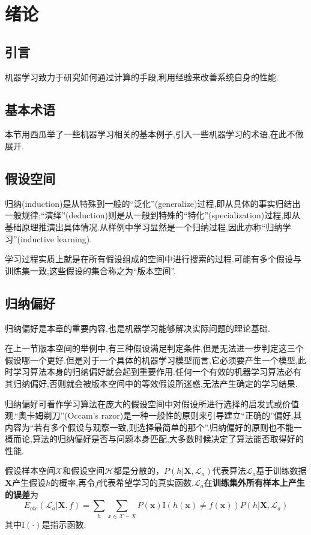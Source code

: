\chapter{绪论}

\section{引言}

机器学习致力于研究如何通过计算的手段,利用经验来改善系统自身的性能.

\section{基本术语}

本节用西瓜举了一些机器学习相关的基本例子,引入一些机器学习的术语,在此不做展开.

\section{假设空间}

归纳(induction)是从特殊到一般的``泛化''(generalize)过程,即从具体的事实归结出一般规律;``演绎''(deduction)则是从一般到特殊的``特化''(specialization)过程,即从基础原理推演出具体情况.从样例中学习显然是一个归纳过程,因此亦称``归纳学习''(inductive learning).

学习过程实质上就是在所有假设组成的空间中进行搜索的过程.可能有多个假设与训练集一致,这些假设的集合称之为``版本空间''.

\section{归纳偏好}

归纳偏好是本章的重要内容,也是机器学习能够解决实际问题的理论基础.

在上一节版本空间的举例中,有三种假设满足判定条件,但是无法进一步判定这三个假设哪一个更好.但是对于一个具体的机器学习模型而言,它必须要产生一个模型,此时学习算法本身的归纳偏好就会起到重要作用.任何一个有效的机器学习算法必有其归纳偏好,否则就会被版本空间中的等效假设所迷惑,无法产生确定的学习结果.

归纳偏好可看作学习算法在庞大的假设空间中对假设所进行选择的启发式或价值观.``奥卡姆剃刀''(Occam's razor)是一种一般性的原则来引导建立``正确的''偏好,其内容为``若有多个假设与观察一致,则选择最简单的那个''.归纳偏好的原则也不能一概而论,算法的归纳偏好是否与问题本身匹配,大多数时候决定了算法能否取得好的性能.

假设样本空间$\mathcal X$和假设空间$\mathcal H$都是分散的，$P(h|\mathbf X,\mathcal L_a)$代表算法$\mathcal L_a$基于训练数据$\mathbf X$产生假设$h$的概率,再令$f$代表希望学习的真实函数.$\mathcal L_a$在\textbf{训练集外所有样本上产生的误差}为
\begin{equation}
E_{ote}(\mathcal L_a|\mathbf X, f)=\sum_h\sum_{x\in\mathcal X - X}P(\mathbf x)\text{I}(h(\mathbf x)\ne f(\mathbf x))P(h|\mathbf X,\mathcal L_a)
\end{equation}
其中$\text{I}(\cdot)$是指示函数.


